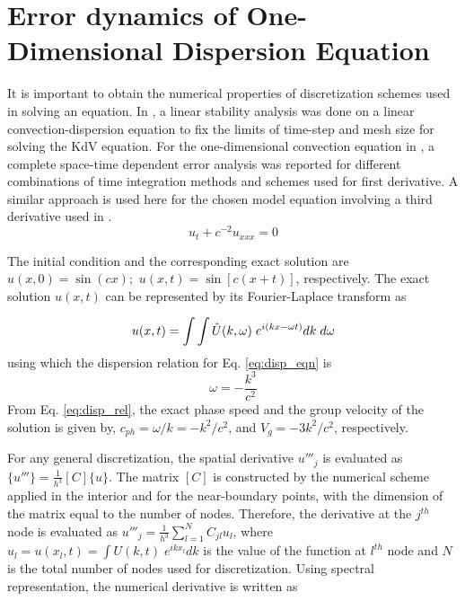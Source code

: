 \documentclass{svjour3}                    %
\begin{document}
\section{Error dynamics of One-Dimensional Dispersion Equation} 
\label{sec:err}
It is important to obtain the numerical properties of discretization schemes used in solving an equation. In \cite{Fornberg1978}, a linear stability analysis was done on a linear convection-dispersion equation to fix the limits of time-step and mesh size for solving the KdV equation. For the one-dimensional convection equation in \cite{Sengupta2007}, a complete space-time dependent error analysis was reported for different combinations of time integration methods and schemes used for first derivative. A similar approach is used here for the chosen model equation involving a third derivative 
used in \cite{Li2006,Yan2002}.
\begin{equation}
\label{eq:disp_eqn}
u_t + c^{-2}u_{xxx} = 0
\end{equation}

The initial condition and the corresponding exact solution are $u(x,0)=\sin(cx);$ $u(x,t)=\sin[c(x+t)]$, respectively. The exact solution $u(x,t)$ can be represented  by its Fourier-Laplace transform as 

\begin{equation*} 
u(x,t) = \int \int \hat{U}(k, \omega)  \hspace{1mm} e^{i(kx-\omega t)} dk 
\hspace{1mm} d{\omega}
\end{equation*}
using which the dispersion relation for Eq. \eqref{eq:disp_eqn} is 
\begin{equation}
\label{eq:disp_rel}
\omega = -\frac{k^3}{c^2}
\end{equation}
From Eq. \eqref{eq:disp_rel}, the exact phase speed and the group velocity of the solution is given by, $c_{ph} = \omega/k= -k^2/c^2$, and 
$V_g = -3k^2/c^2$, respectively.

For any general discretization, the spatial derivative $u'''_j$ is evaluated as $\{u'''\} = \frac {1}{h^3} [C] \{u\}$. The matrix $[C]$ is constructed 
by the numerical scheme applied in the interior and for the near-boundary points, with the dimension of the matrix equal to the number of nodes. 
Therefore, the derivative at the $j^{th}$ node is evaluated as $u'''_j = \frac {1}{h^3} \sum_{l=1}^{N} C_{jl} u_l$, where $ u_l = u(x_l,t) = \int U(k,t)\; e^{i k x_l} dk$ is the value of the function at $l^{th}$ node and $N$ is the total number of nodes used for discretization. Using spectral representation, the numerical derivative is written as
\end{document}
